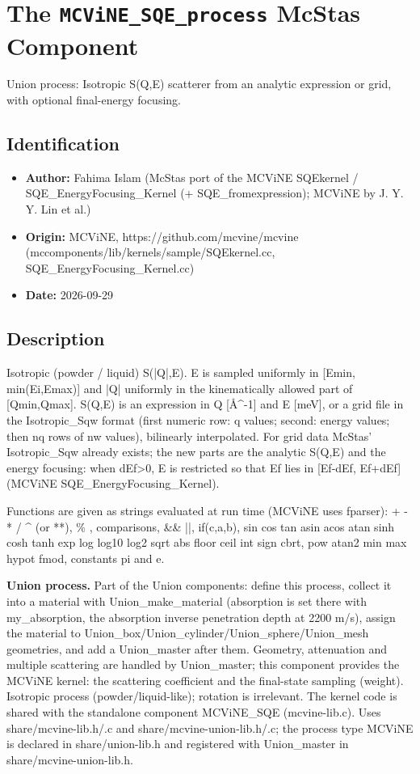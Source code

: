 \section{The \texttt{MCViNE\_SQE\_process} McStas Component}
Union process: Isotropic S(Q,E) scatterer from an analytic expression or grid, with optional final-energy focusing.

\subsection*{Identification}
\begin{itemize}
  \item \textbf{Author:} Fahima Islam (McStas port of the MCViNE SQEkernel / SQE\_EnergyFocusing\_Kernel (+ SQE\_fromexpression); MCViNE by J. Y. Y. Lin et al.)
  \item \textbf{Origin:} MCViNE, https://github.com/mcvine/mcvine (mccomponents/lib/kernels/sample/SQEkernel.cc, SQE\_EnergyFocusing\_Kernel.cc)
  \item \textbf{Date:} 2026-09-29
\end{itemize}

\subsection*{Description}
Isotropic (powder / liquid) S(|Q|,E). E is sampled uniformly in [Emin, min(Ei,Emax)] and |Q| uniformly in the kinematically allowed part of [Qmin,Qmax]. S(Q,E) is an expression in Q [\AA{}\textasciicircum{}-1] and E [meV], or a grid file in the Isotropic\_Sqw format (first numeric row: q values; second: energy values; then nq rows of nw values), bilinearly interpolated. For grid data McStas' Isotropic\_Sqw already exists; the new parts are the analytic S(Q,E) and the energy focusing: when dEf\textgreater{}0, E is restricted so that Ef lies in [Ef-dEf, Ef+dEf] (MCViNE SQE\_EnergyFocusing\_Kernel).

Functions are given as strings evaluated at run time (MCViNE uses fparser): + - * / \textasciicircum{} (or **), \% , comparisons, \&\& ||, if(c,a,b), sin cos tan asin acos atan sinh cosh tanh exp log log10 log2 sqrt abs floor ceil int sign cbrt, pow atan2 min max hypot fmod, constants pi and e.

\textbf{Union process.} Part of the Union components: define this process, collect it into a material with Union\_make\_material (absorption is set there with my\_absorption, the absorption inverse penetration depth at 2200 m/s), assign the material to Union\_box/Union\_cylinder/Union\_sphere/Union\_mesh geometries, and add a Union\_master after them. Geometry, attenuation and multiple scattering are handled by Union\_master; this component provides the MCViNE kernel: the scattering coefficient and the final-state sampling (weight). Isotropic process (powder/liquid-like); rotation is irrelevant. The kernel code is shared with the standalone component MCViNE\_SQE (mcvine-lib.c). Uses share/mcvine-lib.h/.c and share/mcvine-union-lib.h/.c; the process type MCViNE is declared in share/union-lib.h and registered with Union\_master in share/mcvine-union-lib.h.

